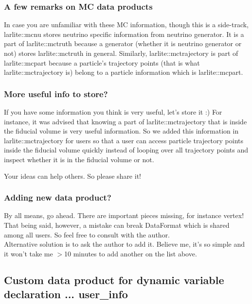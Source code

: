 \subsubsection{A few remarks on MC data products}
In case you are unfamiliar with these MC information, though this is a side-track, {\ttfamily larlite::mcnu} stores neutrino specific information from neutrino generator. It is a part of {\ttfamily larlite::mctruth} because a generator (whether it is neutrino generator or not) stores {\ttfamily larlite::mctruth} in general. Similarly, {\ttfamily larlite::mctrajectory} is part of {\ttfamily larlite::mcpart} because a particle's trajectory points (that is what {\ttfamily larlite::mctrajectory} is) belong to a particle information which is {\ttfamily larlite::mcpart}.

\subsubsection{More useful info to store?}
If you have some information you think is very useful, let's store it :)
For instance, it was advised that knowing a part of {\ttfamily larlite::mctrajectory} that is inside the fiducial volume is very useful information.
So we added this information in {\ttfamily larlite::mctrajectory} for users so that a user can access particle trajectory points inside the fiducial volume quickly instead of looping over all trajectory points and inspect whether it is in the fiducial volume or not.

Your ideas can help others. So please share it!

\subsubsection{Adding new data product?}
By all means, go ahead. There are important pieces missing, for instance vertex!
That being said, however, a mistake can break DataFormat which is shared among all users.
So feel free to consult with the author.\\

Alternative solution is to ask the author to add it. 
Believe me, it's so simple and it won't take me $>$10 minutes to add another on the list above.

\subsection{Custom data product for dynamic variable declaration ... {\ttfamily user\_info}}

